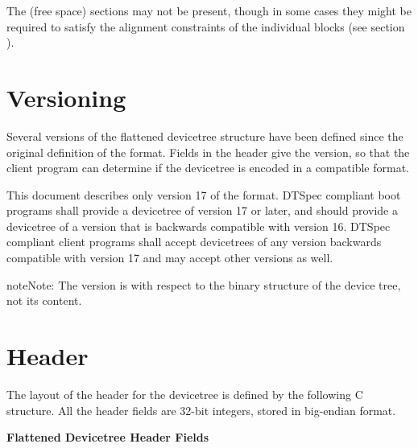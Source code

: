 \documentclass[a4paper,10pt,oneside]{sphinxmanual}
\begin{document}
The (free space) sections may not be present, though in some cases they
might be required to satisfy the alignment constraints of the individual
blocks (see section {\hyperref[flattened\string-format:sect\string-fdt\string-alignment]{}}).


\section{Versioning}
\label{flattened-format:sect-fdt-versioning}\label{flattened-format:versioning}
Several versions of the flattened devicetree structure have been defined since
the original definition of the format. Fields in the header give the version,
so that the client program can determine if the devicetree is encoded in a
compatible format.

This document describes only version 17 of the format. DTSpec compliant boot
programs shall provide a devicetree of version 17 or later, and should provide
a devicetree of a version that is backwards compatible with version 16.
DTSpec compliant client programs shall accept devicetrees of any version
backwards compatible with version 17 and may accept other versions as well.

\begin{notice}{note}{Note:}
The version is with respect to the binary structure of the device
tree, not its content.
\end{notice}


\section{Header}
\label{flattened-format:sect-fdt-header}\label{flattened-format:header}
The layout of the header for the devicetree is defined by the following
C structure. All the header fields are 32-bit integers, stored in
big-endian format.

\textbf{Flattened Devicetree Header Fields}
\end{document}
